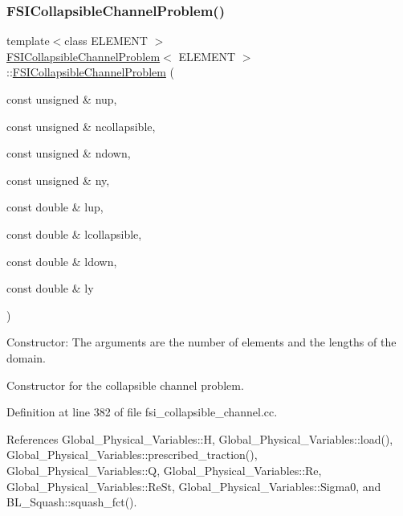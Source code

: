 \subsubsection{\texorpdfstring{F\+S\+I\+Collapsible\+Channel\+Problem()}{FSICollapsibleChannelProblem()}\hspace{0.1cm}{\footnotesize\ttfamily [1/4]}}
{\footnotesize\ttfamily template$<$class E\+L\+E\+M\+E\+NT $>$ \\
\hyperlink{classFSICollapsibleChannelProblem}{F\+S\+I\+Collapsible\+Channel\+Problem}$<$ E\+L\+E\+M\+E\+NT $>$\+::\hyperlink{classFSICollapsibleChannelProblem}{F\+S\+I\+Collapsible\+Channel\+Problem} (\begin{DoxyParamCaption}\item[{const unsigned \&}]{nup,  }\item[{const unsigned \&}]{ncollapsible,  }\item[{const unsigned \&}]{ndown,  }\item[{const unsigned \&}]{ny,  }\item[{const double \&}]{lup,  }\item[{const double \&}]{lcollapsible,  }\item[{const double \&}]{ldown,  }\item[{const double \&}]{ly }\end{DoxyParamCaption})}



Constructor\+: The arguments are the number of elements and the lengths of the domain. 

Constructor for the collapsible channel problem. 

Definition at line 382 of file fsi\+\_\+collapsible\+\_\+channel.\+cc.



References Global\+\_\+\+Physical\+\_\+\+Variables\+::H, Global\+\_\+\+Physical\+\_\+\+Variables\+::load(), Global\+\_\+\+Physical\+\_\+\+Variables\+::prescribed\+\_\+traction(), Global\+\_\+\+Physical\+\_\+\+Variables\+::Q, Global\+\_\+\+Physical\+\_\+\+Variables\+::\+Re, Global\+\_\+\+Physical\+\_\+\+Variables\+::\+Re\+St, Global\+\_\+\+Physical\+\_\+\+Variables\+::\+Sigma0, and B\+L\+\_\+\+Squash\+::squash\+\_\+fct().

\mbox{\label{classFSICollapsibleChannelProblem_abe33aaaae15ea3eb10885527a1d1ad9a}} 
